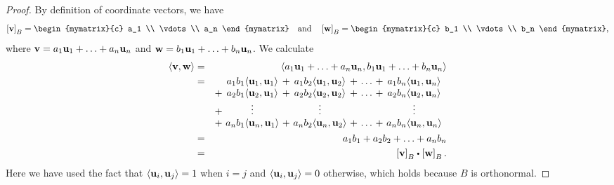\begin{proof}
  By definition of coordinate vectors, we have
  \begin{equation*}
    \coord{\vect{v}}_B
    = \begin{mymatrix}{c} a_1 \\ \vdots \\ a_n \end{mymatrix}
    \quad\mbox{and}\quad
    \coord{\vect{w}}_B
    = \begin{mymatrix}{c} b_1 \\ \vdots \\ b_n \end{mymatrix},
  \end{equation*}
  where $\vect{v} = a_1\vect{u}_1 + \ldots + a_n\vect{u}_n$
  and $\vect{w} = b_1\vect{u}_1 + \ldots + b_n\vect{u}_n$.
  We calculate
  \begin{eqnarray*}
    \iprod{\vect{v},\vect{w}}
    &=& \iprod{a_1\vect{u}_1 + \ldots + a_n\vect{u}_n, b_1\vect{u}_1 +
        \ldots + b_n\vect{u}_n} \\
    &=& \begin{array}[t]{@{}c@{~}c@{~}c@{~}c@{~}c@{~}c@{~}c@{~}c}
          &   a_1b_1\iprod{\vect{u}_1,\vect{u}_1}
          &+& a_1b_2\iprod{\vect{u}_1,\vect{u}_2}
          &+& \ldots
          &+& a_1b_n\iprod{\vect{u}_1,\vect{u}_n} \\
          +&  a_2b_1\iprod{\vect{u}_2,\vect{u}_1}
          &+& a_2b_2\iprod{\vect{u}_2,\vect{u}_2}
          &+& \ldots
          &+& a_2b_n\iprod{\vect{u}_2,\vect{u}_n} \\
          +&  \vdots
          && \vdots
          &&
          && \vdots \\
          +&  a_nb_1\iprod{\vect{u}_n,\vect{u}_1}
          &+& a_nb_2\iprod{\vect{u}_n,\vect{u}_2}
          &+& \ldots
          &+& a_nb_n\iprod{\vect{u}_n,\vect{u}_n}
        \end{array} \\
    &=& a_1b_1 + a_2b_2 + \ldots + a_nb_n \\
    &=& \coord{\vect{v}}_B \dotprod \coord{\vect{w}}_B.
  \end{eqnarray*}
  Here we have used the fact that $\iprod{\vect{u}_i,\vect{u}_j}=1$
  when $i=j$ and $\iprod{\vect{u}_i,\vect{u}_j}=0$ otherwise, which
  holds because $B$ is orthonormal.
\end{proof}
